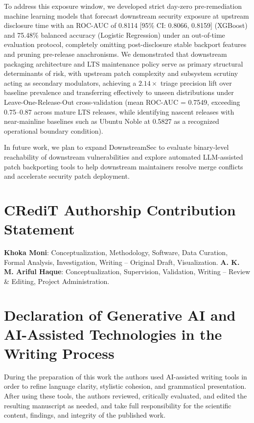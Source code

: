 \documentclass[final,5p,times,twocolumn]{elsarticle}
\begin{document}
To address this exposure window, we developed strict day-zero pre-remediation machine learning models that forecast downstream security exposure at upstream disclosure time with an ROC-AUC of 0.8114 [95\% CI: 0.8066, 0.8159] (XGBoost) and 75.48\% balanced accuracy (Logistic Regression) under an out-of-time evaluation protocol, completely omitting post-disclosure stable backport features and pruning pre-release anachronisms. We demonstrated that downstream packaging architecture and LTS maintenance policy serve as primary structural determinants of risk, with upstream patch complexity and subsystem scrutiny acting as secondary modulators, achieving a $2.14\times$ triage precision lift over baseline prevalence and transferring effectively to unseen distributions under Leave-One-Release-Out cross-validation (mean ROC-AUC = 0.7549, exceeding 0.75--0.87 across mature LTS releases, while identifying nascent releases with near-mainline baselines such as Ubuntu Noble at 0.5827 as a recognized operational boundary condition).

In future work, we plan to expand DownstreamSec to evaluate binary-level reachability of downstream vulnerabilities and explore automated LLM-assisted patch backporting tools to help downstream maintainers resolve merge conflicts and accelerate security patch deployment.

\section*{CRediT Authorship Contribution Statement}
\textbf{Khoka Moni}: Conceptualization, Methodology, Software, Data Curation, Formal Analysis, Investigation, Writing -- Original Draft, Visualization. \textbf{A. K. M. Ariful Haque}: Conceptualization, Supervision, Validation, Writing -- Review \& Editing, Project Administration.

\section*{Declaration of Generative AI and AI-Assisted Technologies in the Writing Process}
During the preparation of this work the authors used AI-assisted writing tools in order to refine language clarity, stylistic cohesion, and grammatical presentation. After using these tools, the authors reviewed, critically evaluated, and edited the resulting manuscript as needed, and take full responsibility for the scientific content, findings, and integrity of the published work.
\end{document}
